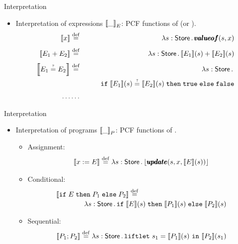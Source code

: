 \documentclass[paper=screen,mode=present,style=zysimple]{powerdot}
\begin{document}
\begin{slide}{Interpretation}
\begin{itemize}
\item Interpretation of expressions ${\left\llbracket{\_}\right\rrbracket}_E$: 
  PCF functions of \emblue{$\tstore \to \tnat$} (or \emblue{$\tstore \to \tbool$}).
\begin{eqnarray*}
{\left\llbracket{x}\right\rrbracket} & \stackrel{\mathrm{def}}{=} & \lambda s : \mathsf{Store} \, . \, \pmb{valueof}(s, x) \\[0.3em]
{\left\llbracket{E_1 + E_2}\right\rrbracket} & \stackrel{\mathrm{def}}{=} & \lambda s : \mathsf{Store} \, . \, {\left\llbracket{E_1}\right\rrbracket} (s) + {\left\llbracket{E_2}\right\rrbracket} (s) \\[0.3em]
{\left\llbracket{E_1 \stackrel{\mbox{\tiny ?}}{=}E_2}\right\rrbracket} & \stackrel{\mathrm{def}}{=} & 
\lambda s : \mathsf{Store} \, . \, \\
& & \qquad \mathtt{if} \; {{\left\llbracket{E_1}\right\rrbracket} (s) \stackrel{\mbox{\tiny ?}}{=} {\left\llbracket{E_2}\right\rrbracket} (s)} \; \mathtt{then} \; {\mathtt{true}} \; \mathtt{else} \; {\mathtt{false}} \\[0.3em]
\ldots & \ldots & 
\end{eqnarray*}
\end{itemize}
\end{slide}

\begin{slide}{Interpretation}
\begin{itemize}
\item Interpretation of programs ${\left\llbracket{\_}\right\rrbracket}_P$: PCF functions of \emred{$\tstore \to \tlift\tstore$}.
\begin{itemize}
\item Assignment:
\vspace*{-0.5em}
\[
\Eval{x := E} \defeq \lambda s : \tstore \ldot \clift{\cupdate(s, x, \Eval{E} (s))}
\vspace*{-1.5em}
\]
\item Conditional: 
\vspace*{-0.5em}
\[
\begin{array}{l}
\Eval{\cif{E}{P_1}{P_2}} \defeq \\[0.2em]
\qquad\qquad \lambda s : \tstore \ldot \cif{\Eval{E}(s)}{\Eval{P_1} (s)}{\Eval{P_2} (s)}
\end{array}
\vspace*{-1em}
\]
\item Sequential: 
\vspace*{-0.5em}
\[
\Eval{P_1 ; P_2} \defeq \lambda s : \tstore \ldot 
\cletst{s_1}{\Eval{P_1} (s)}{\Eval{P_2} (s_1)}
\vspace*{-1.5em}
\]
\end{itemize}
\end{itemize}
\end{slide}
\end{document}

